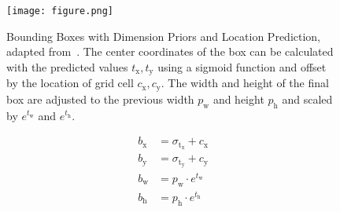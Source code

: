 \documentclass{article}
\begin{document}
\begin{figure}[ht]
    \centering
    \texttt{[image: figure.png]}
    \caption{Bounding Boxes with Dimension Priors and Location Prediction, adapted from~\cite{RF.17}. The center coordinates of the box can be calculated with the predicted values $t_{\mathrm{x}}, t_{\mathrm{y}}$ using a sigmoid function and offset by the location of grid cell $c_{\mathrm{x}}, c_{\mathrm{y}}$. The width and height of the final box are adjusted to the previous width $p_{\mathrm{w}}$ and height $p_{\mathrm{h}}$ and scaled by $e^{t_{\mathrm{w}}}$ and $e^{t_{\mathrm{h}}}$.}
    \label{fig:bounding_boxes}
\end{figure}

\begin{equation}
    \begin{aligned}
        b_{\mathrm{x}} &= \sigma_{\mathrm{t_{\mathrm{x}}}} + c_{\mathrm{x}} \\
        b_{\mathrm{y}} &= \sigma_{\mathrm{t_{\mathrm{y}}}} + c_{\mathrm{y}} \\
        b_{\mathrm{w}} &= p_{\mathrm{w}} \cdot e^{t_{\mathrm{w}}} \\
        b_{\mathrm{h}} &= p_{\mathrm{h}} \cdot e^{t_{\mathrm{h}}}
    \end{aligned}
\end{equation}
\end{document}
